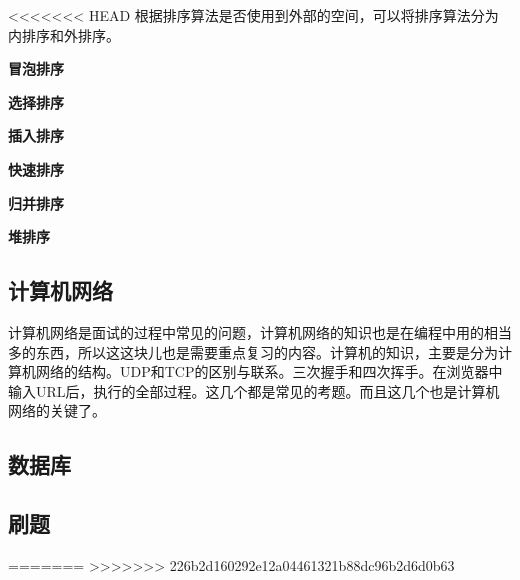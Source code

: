 \documentclass[UTF8]{ctexart}
\begin{document}
<<<<<<< HEAD
根据排序算法是否使用到外部的空间，可以将排序算法分为内排序和外排序。


\textbf{冒泡排序}


\textbf{选择排序}


\textbf{插入排序}


\textbf{快速排序}


\textbf{归并排序}


\textbf{堆排序}

\subsection{计算机网络}

计算机网络是面试的过程中常见的问题，计算机网络的知识也是在编程中用的相当多的东西，所以这这块儿也是需要重点复习的内容。计算机的知识，主要是分为计算机网络的结构。UDP和TCP的区别与联系。三次握手和四次挥手。在浏览器中输入URL后，执行的全部过程。这几个都是常见的考题。而且这几个也是计算机网络的关键了。

\subsection{数据库}
\subsection{刷题}
=======
>>>>>>> 226b2d160292e12a04461321b88dc96b2d6d0b63




\end{document}
